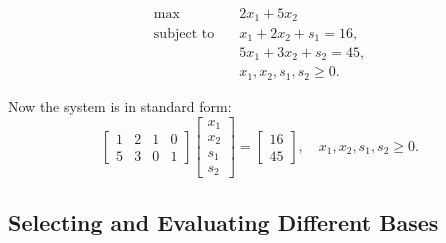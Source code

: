 \[
\begin{aligned}
    \max \quad & 2 x_1 + 5 x_2 \\
    \text{subject to} \quad 
    & x_1 + 2x_2 + s_1 = 16, \\
    & 5x_1 + 3x_2 + s_2 = 45, \\
    & x_1, x_2, s_1, s_2 \geq 0.
\end{aligned}
\]

Now the system is in standard form:
\[
\begin{bmatrix}
    1 & 2 & 1 & 0 \\
    5 & 3 & 0 & 1
\end{bmatrix}
\begin{bmatrix}
    x_1 \\ x_2 \\ s_1 \\ s_2
\end{bmatrix}
=
\begin{bmatrix}
    16 \\ 45
\end{bmatrix}, \quad x_1, x_2, s_1, s_2 \geq 0.
\]

\subsection{Selecting and Evaluating Different Bases}

